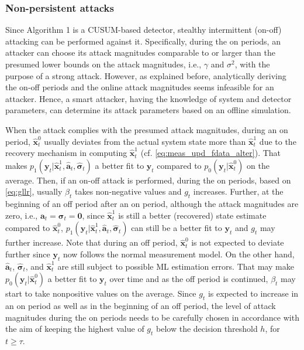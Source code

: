 \documentclass[onecolumn]{IEEEtran}
\begin{document}
\subsubsection{Non-persistent attacks}

Since Algorithm 1 is a CUSUM-based detector, stealthy intermittent (on-off) attacking can be performed against it. Specifically, during the on periods, an attacker can choose its attack magnitudes comparable to or larger than the presumed lower bounds on the attack magnitudes, i.e., $\gamma$ and $\sigma^2$, with the purpose of a strong attack. However, as explained before, analytically deriving the on-off periods and the online attack magnitudes seems infeasible for an attacker. Hence, a smart attacker, having the knowledge of system and detector parameters, can determine its attack parameters based on an offline simulation.

When the attack complies with the presumed attack magnitudes, during an on period, $\hat{\mathbf{x}}_t^0$ usually deviates from the actual system state more than $\hat{\mathbf{x}}_t^1$ due to the recovery mechanism in computing $\hat{\mathbf{x}}_t^1$ (cf. \eqref{eq:meas_upd_fdata_alter}). That makes $p_1(\mathbf{y}_t|\hat{\mathbf{x}}_t^1, \hat{\mathbf{a}}_t, \hat{\pmb{\sigma}}_t)$ a better fit to $\mathbf{y}_t$ compared to $p_0(\mathbf{y}_t|\hat{\mathbf{x}}_t^0)$ on the average. Then, if an on-off attack is performed, during the on periods, based on \eqref{eq:gllr}, usually $\beta_t$ takes non-negative values and $g_t$ increases. Further, at the beginning of an off period after an on period, although the attack magnitudes are zero, i.e., $\mathbf{a}_t = \pmb{\sigma}_t = \mathbf{0}$, since $\hat{\mathbf{x}}_t^1$ is still a better (recovered) state estimate compared to $\hat{\mathbf{x}}_t^0$, $p_1(\mathbf{y}_t|\hat{\mathbf{x}}_t^1, \hat{\mathbf{a}}_t, \hat{\pmb{\sigma}}_t)$ can still be a better fit to $\mathbf{y}_t$ and $g_t$ may further increase. Note that during an off period, $\hat{\mathbf{x}}_t^0$ is not expected to deviate further since $\mathbf{y}_t$ now follows the normal measurement model. On the other hand, $\hat{\mathbf{a}}_t$, $\hat{\pmb{\sigma}}_t$, and $\hat{\mathbf{x}}_t^1$ are still subject to possible ML estimation errors. That may make $p_0(\mathbf{y}_t|\hat{\mathbf{x}}_t^0)$ a better fit to $\mathbf{y}_t$ over time and as the off period is continued, $\beta_t$ may start to take nonpositive values on the average. Since $g_t$ is expected to increase in an on period as well as in the beginning of an off period, the level of attack magnitudes during the on periods needs to be carefully chosen in accordance with the aim of keeping the highest value of $g_t$ below the decision threshold $h$, for $t \geq \tau$.
\end{document}
